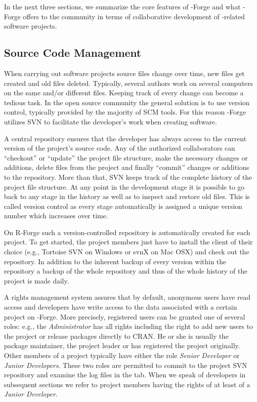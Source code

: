 In the next three sections, we summarize the core features of
\R{}-Forge and what \R{}-Forge offers to the \R{} community in terms
of  collaborative development of \R{}-related software projects.

\subsection{Source Code Management}

When carrying out software projects source files change over time,
new files get created and old files deleted. Typically, several authors
work on several computers on the same and/or different files. Keeping
track of every change can become a tedious task. In the open source
community the general solution is to use version control, typically
provided by the majority of SCM tools. For this reason \R{}-Forge
utilizes SVN to facilitate the developer's work when creating
software.

A central repository ensures that the developer
has always access to the current version of the project's source
code. Any of the authorized collaborators can ``checkout'' or
``update'' the project
file structure, make the necessary changes or additions, delete
files from the project and finally ``commit'' changes or additions
to the repository. More than
that, SVN keeps track of the complete history of the project file
structure. At any point in the development stage it is possible to go
back to any stage in the history as well as to inspect and restore old
files. This is called version control as every stage automatically is
assigned a unique version number which increases over time. 

On R-Forge such a version-controlled repository is automatically
created for each project. To get started, the project members just
have to install the client of their choice (e.g., Tortoise SVN on
Windows or svnX on 
Mac OSX) and check out the repository. In addition to the inherent
backup of every version within the repository a backup of the whole
repository and thus of the whole history of the project is made daily. 

A rights management system assures that by default, anonymous users
have read access and developers have write access to the data associated with 
a certain project on \R{}-Forge. More precisely, registered users can
be granted one of several roles: e.g., the \textit{Administrator} has
all rights including the right to 
add new users to the project or release packages directly to CRAN. He
or she is usually the package 
maintainer, the project leader or has registered the project originally.
Other members of a project typically have either the role \textit{Senior 
Developer} or \textit{Junior Developers}. These two roles are
permitted to commit to the project 
SVN repository and examine the log files in the  tab.
When we speak of developers in subsequent sections we refer to project
members having the rights of at least of a \textit{Junior Developer}.


